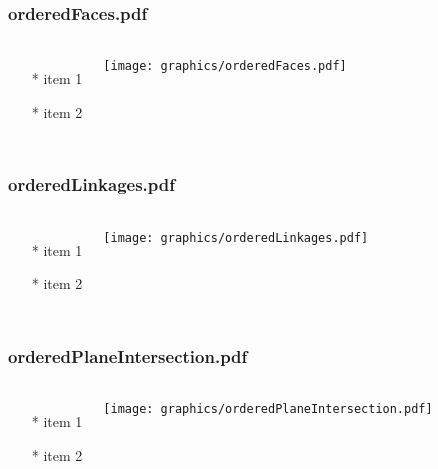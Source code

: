 \begin{frame} \frametitle{orderedFaces.pdf}
    \begin{columns}[c]
        \begin{itemize}
            \item[*] item 1
            \item[*] item 2
        \end{itemize}
        \begin{minipage}{\linewidth}
            \begin{center}
            \texttt{[image: graphics/orderedFaces.pdf]}
            \label{gfx:orderedFaces.pdf}
            \end{center}
        \end{minipage}
    \end{columns}
\end{frame}
\begin{frame} \frametitle{orderedLinkages.pdf}
    \begin{columns}[c]
        \begin{itemize}
            \item[*] item 1
            \item[*] item 2
        \end{itemize}
        \begin{minipage}{\linewidth}
            \begin{center}
            \texttt{[image: graphics/orderedLinkages.pdf]}
            \label{gfx:orderedLinkages.pdf}
            \end{center}
        \end{minipage}
    \end{columns}
\end{frame}
\begin{frame} \frametitle{orderedPlaneIntersection.pdf}
    \begin{columns}[c]
        \begin{itemize}
            \item[*] item 1
            \item[*] item 2
        \end{itemize}
        \begin{minipage}{\linewidth}
            \begin{center}
            \texttt{[image: graphics/orderedPlaneIntersection.pdf]}
            \label{gfx:orderedPlaneIntersection.pdf}
            \end{center}
        \end{minipage}
    \end{columns}
\end{frame}
